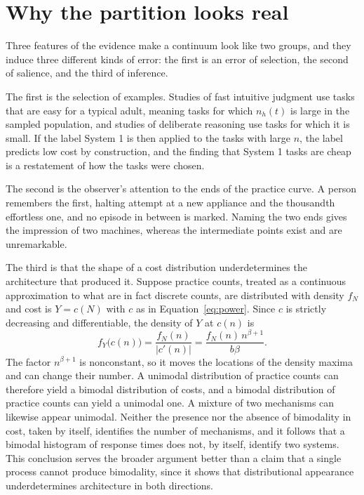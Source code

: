\documentclass[11pt]{report}
\theoremstyle{remark}
\theoremstyle{definition}
\begin{document}
\section{Why the partition looks real}

Three features of the evidence make a continuum look like two groups, and they induce three different kinds of error: the first is an error of selection, the second of salience, and the third of inference.

The first is the selection of examples. Studies of fast intuitive judgment use tasks that are easy for a typical adult, meaning tasks for which $n_h(t)$ is large in the sampled population, and studies of deliberate reasoning use tasks for which it is small. If the label System 1 is then applied to the tasks with large $n$, the label predicts low cost by construction, and the finding that System 1 tasks are cheap is a restatement of how the tasks were chosen.

The second is the observer's attention to the ends of the practice curve. A person remembers the first, halting attempt at a new appliance and the thousandth effortless one, and no episode in between is marked. Naming the two ends gives the impression of two machines, whereas the intermediate points exist and are unremarkable.

The third is that the shape of a cost distribution underdetermines the architecture that produced it. Suppose practice counts, treated as a continuous approximation to what are in fact discrete counts, are distributed with density $f_N$ and cost is $Y=c(N)$ with $c$ as in Equation~\eqref{eq:power}. Since $c$ is strictly decreasing and differentiable, the density of $Y$ at $c(n)$ is
\begin{equation}
f_Y\bigl(c(n)\bigr)=\frac{f_N(n)}{|c'(n)|}=\frac{f_N(n)\,n^{\beta+1}}{b\beta}.
\end{equation}
The factor $n^{\beta+1}$ is nonconstant, so it moves the locations of the density maxima and can change their number. A unimodal distribution of practice counts can therefore yield a bimodal distribution of costs, and a bimodal distribution of practice counts can yield a unimodal one. A mixture of two mechanisms can likewise appear unimodal. Neither the presence nor the absence of bimodality in cost, taken by itself, identifies the number of mechanisms, and it follows that a bimodal histogram of response times does not, by itself, identify two systems. This conclusion serves the broader argument better than a claim that a single process cannot produce bimodality, since it shows that distributional appearance underdetermines architecture in both directions.
\end{document}
